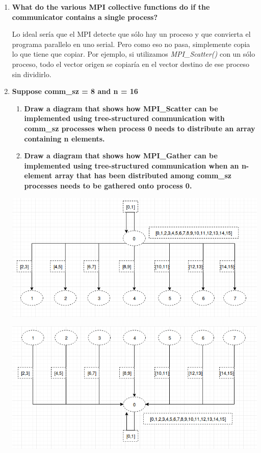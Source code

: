 \documentclass[a4paper,12pt]{article}
\begin{document}
\begin{enumerate}
\item \textbf{What do the various MPI collective functions do if the communicator contains a single process?}

Lo ideal sería que el MPI detecte que sólo hay un proceso y que convierta el programa parallelo en uno serial. Pero como eso
no pasa, simplemente copia lo que tiene que copiar. Por ejemplo, si utilizamos \textit{MPI\_Scatter()} con un sólo proceso, todo
el vector origen se copiaría en el vector destino de ese proceso sin dividirlo.

\item {\textbf{Suppose comm\_sz = 8 and n = 16}
 \begin{enumerate}
  \item \textbf{Draw a diagram that shows how MPI\_Scatter can be implemented using tree-structured communication 
  with comm\_sz processes when process 0 needs to distribute an array containing n elements.}
  \item \textbf{ Draw a diagram that shows how MPI\_Gather can be implemented using tree-structured communication 
  when an n-element array that has been distributed among comm\_sz processes needs to be gathered onto process 0.}
 \end{enumerate}
}

\begin{center}
\includegraphics[scale = 0.5]{8_1.png} \par
\includegraphics[scale = 0.5]{8_2.png}
\end{center}


\end{enumerate}
\end{document}
